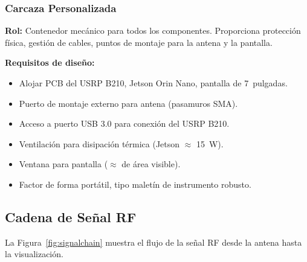 \documentclass[12pt,a4paper]{article}
\begin{document}
\subsubsection{Carcaza Personalizada}

\textbf{Rol:} Contenedor mecánico para todos los componentes. Proporciona protección física, gestión de cables, puntos de montaje para la antena y la pantalla.

\textbf{Requisitos de diseño:}
\begin{itemize}
  \item Alojar PCB del USRP B210, Jetson Orin Nano, pantalla de 7~pulgadas.
  \item Puerto de montaje externo para antena (pasamuros SMA).
  \item Acceso a puerto USB 3.0 para conexión del USRP B210.
  \item Ventilación para disipación térmica (Jetson $\approx$ \qty{15}{\W}).
  \item Ventana para pantalla ($\approx$  de área visible).
  \item Factor de forma portátil, tipo maletín de instrumento robusto.
\end{itemize}

\subsection{Cadena de Señal RF}

La Figura~\ref{fig:signalchain} muestra el flujo de la señal RF desde la antena hasta la visualización.
\end{document}
